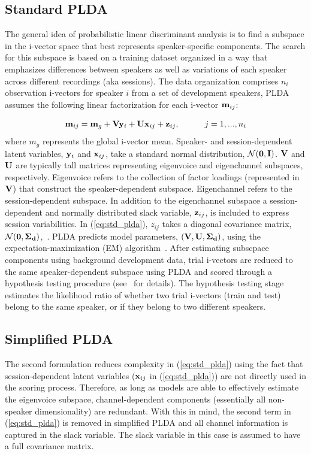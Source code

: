 \subsection{Standard PLDA}
\label{ssec:standard_plda}
The general idea of probabilistic linear discriminant analysis is to find a subspace in the i-vector space that best represents speaker-specific components. 
The search for this subspace is based on a training dataset organized in a way that emphasizes differences between speakers as well as variations of each speaker across different recordings (aka sessions). 
The data organization comprises $n_i$ observation i-vectors for speaker $i$ from a set of development speakers, PLDA assumes the following linear factorization for each i-vector ${\bf m}_{ij}$: 

\begin{equation}
\label{eq:std_plda}
{\bf m}_{ij} = {\bf m}_g + {\bf V}{\bf y}_i+{\bf U}{\bf x}_{ij}+{\bf z}_{ij},  \hspace{30pt} j=1,...,n_i
\end{equation}
where $m_g$ represents the global i-vector mean. Speaker- and session-dependent latent variables, ${\bf y}_i$ and ${\bf x}_{ij}$, take a standard normal distribution, $\mathcal{N}({\bf 0},{\bf I})$. ${\bf V}$ and ${\bf U}$ are typically tall matrices representing eigenvoice and eigenchannel subspaces, respectively. Eigenvoice refers to the collection of factor loadings (represented in ${\bf V}$) that construct the speaker-dependent subspace. Eigenchannel refers to the session-dependent subspace. 
In addition to the eigenchannel subspace a session-dependent and normally distributed slack variable, ${\bf z}_{ij}$, is included to express session variabilities. In (\ref{eq:std_plda}), $z_{ij}$ takes a diagonal covariance matrix, $\mathcal{N}({\bf 0},{\bf \Sigma_d})$,~\cite{kenny_plda,prince_plda}. 
PLDA predicts model parameters, $({\bf V},{\bf U},{\bf \Sigma_d})$, using the expectation-maximization (EM) algorithm~\cite{prince_plda}. 
After estimating subscpace components using background development data, trial i-vectors are reduced to the same speaker-dependent subspace using PLDA and scored through a hypothesis testing procedure (see~\cite{prince_plda} for details). 
The hypothesis testing stage estimates the likelihood ratio of whether two trial i-vectors (train and test) belong to the same speaker, or if they belong to two different speakers. 

\subsection{Simplified PLDA}
\label{ssec:simplified_plda}
The second formulation reduces complexity in (\ref{eq:std_plda}) using the fact that session-dependent latent variables (${\bf x}_{ij}$ in (\ref{eq:std_plda})) are not directly used in the scoring process. 
Therefore, as long as models are able to effectively estimate the eigenvoice subspace, channel-dependent components (essentially all non-speaker dimensionality) are redundant. 
With this in mind, the second term in (\ref{eq:std_plda}) is removed in simplified PLDA and all channel information is captured in the slack variable. 
The slack variable in this case is assumed to have a full covariance matrix.

